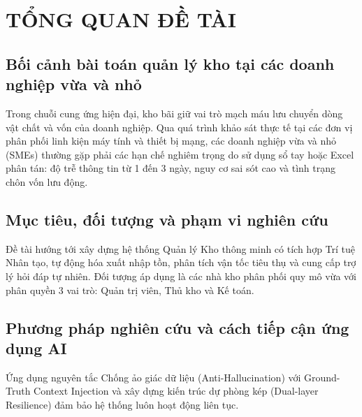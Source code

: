 \chapter{TỔNG QUAN ĐỀ TÀI}
\label{ch:01}

\section{Bối cảnh bài toán quản lý kho tại các doanh nghiệp vừa và nhỏ}
Trong chuỗi cung ứng hiện đại, kho bãi giữ vai trò mạch máu lưu chuyển dòng vật chất và vốn của doanh nghiệp. Qua quá trình khảo sát thực tế tại các đơn vị phân phối linh kiện máy tính và thiết bị mạng, các doanh nghiệp vừa và nhỏ (SMEs) thường gặp phải các hạn chế nghiêm trọng do sử dụng sổ tay hoặc Excel phân tán: độ trễ thông tin từ 1 đến 3 ngày, nguy cơ sai sót cao và tình trạng chôn vốn lưu động.

\section{Mục tiêu, đối tượng và phạm vi nghiên cứu}
Đề tài hướng tới xây dựng hệ thống Quản lý Kho thông minh có tích hợp Trí tuệ Nhân tạo, tự động hóa xuất nhập tồn, phân tích vận tốc tiêu thụ và cung cấp trợ lý hỏi đáp tự nhiên. Đối tượng áp dụng là các nhà kho phân phối quy mô vừa với phân quyền 3 vai trò: Quản trị viên, Thủ kho và Kế toán.

\section{Phương pháp nghiên cứu và cách tiếp cận ứng dụng AI}
Ứng dụng nguyên tắc Chống ảo giác dữ liệu (Anti-Hallucination) với Ground-Truth Context Injection và xây dựng kiến trúc dự phòng kép (Dual-layer Resilience) đảm bảo hệ thống luôn hoạt động liên tục.
